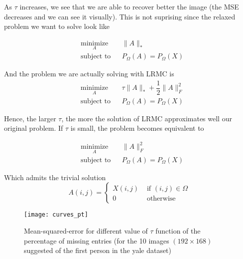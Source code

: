 \documentclass[a4paper, 11pt]{article}
\newcommand{\norm}[1]{\|#1\|}
\begin{document}
As $\tau$ increases, we see that we are able to recover better the
image (the MSE decreases and we can see it visually). This is not
suprising since the relaxed problem we want to solve look like

\begin{equation*}
\begin{aligned}
& \underset{A}{\text{minimize}}
& & \norm{A}_* \\
& \text{subject to}
& & P_\Omega(A)= P_\Omega(X)
\end{aligned}
\end{equation*}

And the problem we are actually solving with LRMC is
\begin{equation}
\begin{aligned}
& \underset{A}{\text{minimize}}
& & \tau \norm{A}_* + \dfrac{1}{2}\norm{A}^2_F \\
& \text{subject to}
& & P_\Omega(A)= P_\Omega(X)
\end{aligned}
\tag{$\star$}
\label{eq:min-reg-relaxed}
\end{equation}

Hence, the larger $\tau$, the more the solution of LRMC approximates
well our original problem.  If $\tau$ is small, the problem becomes
equivalent to

\begin{equation*}
\begin{aligned}
& \underset{A}{\text{minimize}}
& & \norm{A}^2_F \\
& \text{subject to}
& & P_\Omega(A)= P_\Omega(X)
\end{aligned}
\end{equation*}

Which admits the trivial solution
\begin{equation*}
  A(i, j) = \left\{
    \begin{array}{ll}
      X(i, j) & \text{ if } (i, j) \in \Omega \\
      0 & \text{ otherwise}
    \end{array}
    \right.
\end{equation*}


\begin{figure}[h]
  \centering
  \texttt{[image: curves\_pt]}
  \caption{Mean-squared-error for different value of $\tau$ function
    of the percentage of missing entries (for the 10 images
    $(192 \times 168)$ suggested of the first person in the yale
    dataset)}
  \label{fig:curves}
\end{figure}
\end{document}
